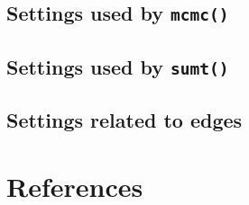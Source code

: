 \documentclass[10pt]{article}
\newcommand{\code}[1]{{\tt #1}}
\begin{document}
\subsection{Settings used by \code{mcmc()}}\label{subsec:mcmcsettings}


\subsection{Settings used by \code{sumt()}}\label{subsec:sumtsettings}


\subsection{Settings related to edges}\label{subsec:edgesettings}


%
%

\section*{References}
\renewcommand{\bibsection}{}


\printindex
\end{document}
